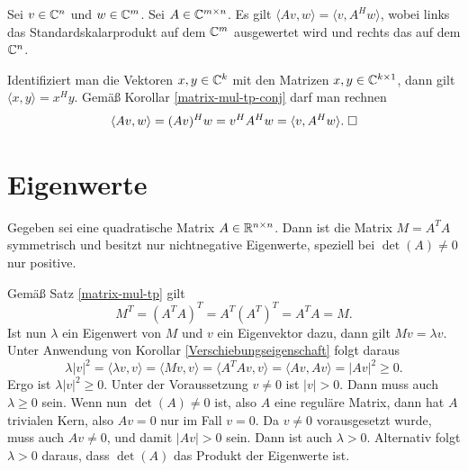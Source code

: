 \begin{Korollar}\label{Verschiebungseigenschaft-komplex}
Sei $v\in\mathbb C^n$ und $w\in\mathbb C^m$. Sei $A\in\mathbb C^{m\times n}$.
Es gilt $\langle Av,w\rangle = \langle v,A^H w\rangle$,
wobei links das Standardskalarprodukt auf dem $\mathbb C^m$ ausgewertet
wird und rechts das auf dem $\mathbb C^n$.
\end{Korollar}
\begin{Beweis}
Identifiziert man die Vektoren $x,y\in\mathbb C^k$ mit den Matrizen
$x,y\in\mathbb C^{k\times 1}$, dann gilt $\langle x,y\rangle = x^H y$.
Gemäß Korollar \ref{matrix-mul-tp-conj} darf man rechnen
\[\langle Av,w\rangle = (Av)^H w = v^H A^H w
= \langle v,A^Hw\rangle.\;\square\]
\end{Beweis}

\section{Eigenwerte}

\begin{Satz}
Gegeben sei eine quadratische Matrix $A\in\mathbb R^{n\times n}$.
Dann ist die Matrix $M=A^T A$ symmetrisch und besitzt nur
nichtnegative Eigenwerte, speziell bei $\det(A)\ne 0$ nur positive.
\end{Satz}

\begin{Beweis}
Gemäß Satz \ref{matrix-mul-tp} gilt
\begin{equation}
M^T = (A^T A)^T = A^T (A^T)^T = A^T A = M.
\end{equation}
Ist nun $\lambda$ ein Eigenwert von $M$ und $v$ ein Eigenvektor dazu,
dann gilt $Mv=\lambda v$. Unter Anwendung von Korollar
\ref{Verschiebungseigenschaft} folgt daraus
\begin{equation}
\lambda |v|^2 = \langle\lambda v,v\rangle
= \langle Mv,v\rangle = \langle A^T Av,v\rangle
= \langle Av,Av\rangle = |Av|^2\ge 0.
\end{equation}
Ergo ist $\lambda|v|^2\ge 0$. Unter der Voraussetzung $v\ne 0$ ist
$|v|>0$. Dann muss auch $\lambda\ge 0$ sein. Wenn nun $\det(A)\ne 0$
ist, also $A$ eine reguläre Matrix, dann hat $A$ trivialen Kern,
also $Av=0$ nur im Fall $v=0$. Da $v\ne 0$ vorausgesetzt wurde,
muss auch $Av\ne 0$, und damit $|Av|>0$ sein. Dann ist auch
$\lambda>0$. Alternativ folgt $\lambda>0$ daraus, dass $\det(A)$
das Produkt der Eigenwerte ist.\;\qedsymbol
\end{Beweis}

